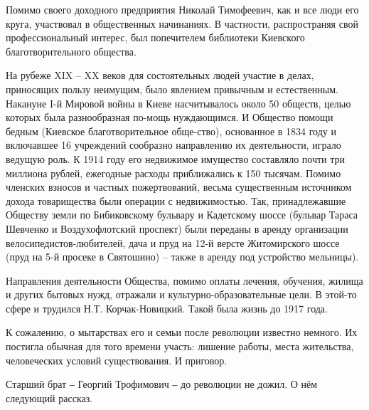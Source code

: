 Помимо своего доходного предприятия Николай Тимофеевич, как и все люди его
круга, участвовал в общественных начинаниях. В частности, распространяя свой
профессиональный интерес, был попечителем библиотеки Киевского
благотворительного общества. 

На рубеже XIX – XX веков для состоятельных людей участие в делах, приносящих
пользу неимущим, было явлением привычным и естественным. Накануне I-й Мировой
войны в Киеве насчитывалось около 50 обществ, целью которых была разнообразная
по-мощь нуждающимся. И Общество помощи бедным (Киевское благотворительное
обще-ство), основанное в 1834 году и включавшее 16 учреждений сообразно
направлению их деятельности, играло ведущую роль. К 1914 году его недвижимое
имущество составляло почти три миллиона рублей, ежегодные расходы приближались
к 150 тысячам. Помимо членских взносов и частных пожертвований, весьма
существенным источником дохода товарищества были операции с недвижимостью. Так,
принадлежавшие Обществу земли по Бибиковскому бульвару и Кадетскому шоссе
(бульвар Тараса Шевченко и Воздухофлотский проспект) были переданы в аренду
организации велосипедистов-любителей, дача и пруд на 12-й версте Житомирского
шоссе (пруд на 5-й просеке в Святошино) – также в аренду под устройство
мельницы).

Направления деятельности Общества, помимо оплаты лечения, обучения, жилища и
других бытовых нужд, отражали и культурно-образовательные цели. В этой-то сфере
и трудился Н.Т. Корчак-Новицкий. Такой была жизнь до 1917 года.

К сожалению, о мытарствах его и семьи после революции известно немного. Их
постигла обычная для того времени участь: лишение работы, места жительства,
человеческих условий существования. И приговор.

Старший брат ‒ Георгий Трофимович ‒ до революции не дожил. О нём следующий
рассказ.

